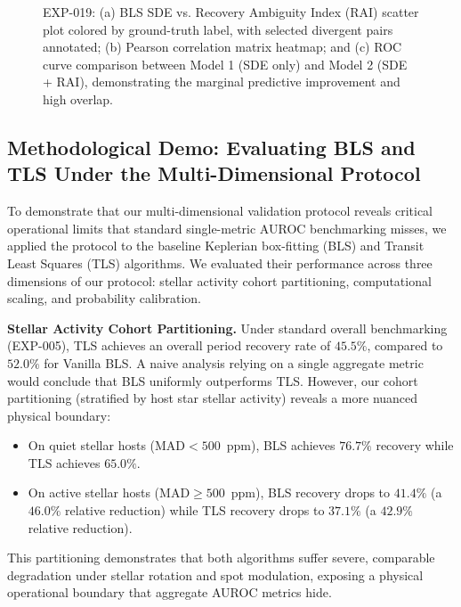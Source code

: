 

\begin{figure}[htbp]
\centering
{}
\caption{EXP-019: (a) BLS SDE vs. Recovery Ambiguity Index (RAI) scatter plot colored by ground-truth label, with selected divergent pairs annotated; (b) Pearson correlation matrix heatmap; and (c) ROC curve comparison between Model 1 (SDE only) and Model 2 (SDE + RAI), demonstrating the marginal predictive improvement and high overlap.}
\label{fig:exp019_results}
\end{figure}

\subsection{Methodological Demo: Evaluating BLS and TLS Under the Multi-Dimensional Protocol}
\label{sec:methodological_demo}

To demonstrate that our multi-dimensional validation protocol reveals critical operational limits that standard single-metric AUROC benchmarking misses, we applied the protocol to the baseline Keplerian box-fitting (BLS) and Transit Least Squares (TLS) algorithms. We evaluated their performance across three dimensions of our protocol: stellar activity cohort partitioning, computational scaling, and probability calibration.

\textbf{Stellar Activity Cohort Partitioning.} 
Under standard overall benchmarking (EXP-005), TLS achieves an overall period recovery rate of $45.5\%$, compared to $52.0\%$ for Vanilla BLS. A naive analysis relying on a single aggregate metric would conclude that BLS uniformly outperforms TLS. However, our cohort partitioning (stratified by host star stellar activity) reveals a more nuanced physical boundary:
\begin{itemize}
    \item On quiet stellar hosts ($\text{MAD} < 500$~ppm), BLS achieves $76.7\%$ recovery while TLS achieves $65.0\%$.
    \item On active stellar hosts ($\text{MAD} \ge 500$~ppm), BLS recovery drops to $41.4\%$ (a $46.0\%$ relative reduction) while TLS recovery drops to $37.1\%$ (a $42.9\%$ relative reduction).
\end{itemize}
This partitioning demonstrates that both algorithms suffer severe, comparable degradation under stellar rotation and spot modulation, exposing a physical operational boundary that aggregate AUROC metrics hide.


